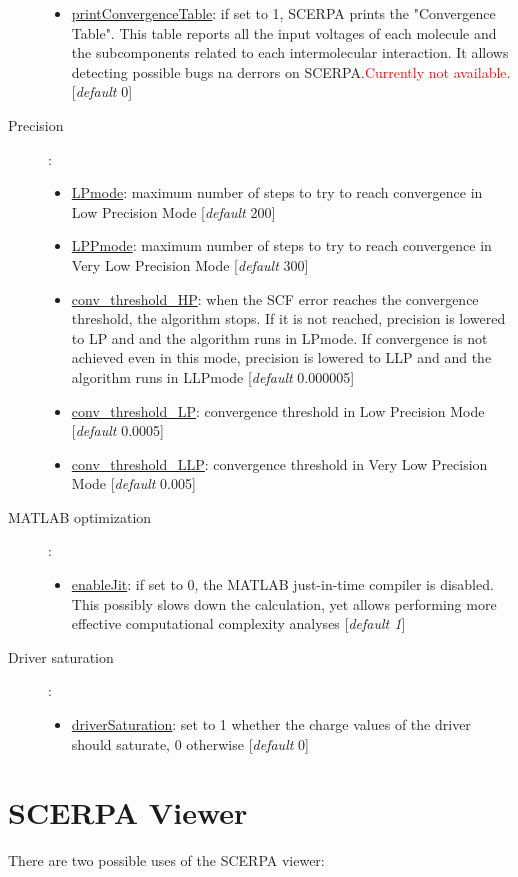 \documentclass[a4paper,10pt]{article}
\begin{document}
\begin{description}
\begin{itemize}
	\item \underline{printConvergenceTable}: if set to 1, SCERPA prints the "Convergence Table". This table reports all the input voltages of each molecule and the subcomponents related to each intermolecular interaction. It allows detecting possible bugs na derrors on SCERPA.\textcolor{red}{Currently not available.} [\textit{default} 0] 
	\end{itemize}
\item[Precision]:
	\begin{itemize}
	\item \underline{LPmode}: maximum number of steps to try to reach convergence in Low Precision Mode [\textit{default} 200] 
	\item \underline{LPPmode}: maximum number of steps to try to reach convergence in Very Low Precision Mode [\textit{default} 300] 
	\item \underline{conv\_threshold\_HP}: when the SCF error reaches the convergence threshold, the algorithm stops. If it is not reached, precision is lowered to LP and and the algorithm runs in LPmode. If convergence is not achieved even in this mode, precision is lowered to LLP and and the algorithm runs in LLPmode [\textit{default} 0.000005] 
	\item \underline{conv\_threshold\_LP}: convergence threshold in Low Precision Mode [\textit{default} 0.0005] 
	\item \underline{conv\_threshold\_LLP}: convergence threshold in Very Low Precision Mode [\textit{default} 0.005] 
	\end{itemize}
\item[MATLAB optimization]:
	\begin{itemize}
	\item \underline{enableJit}: if set to 0, the MATLAB just-in-time compiler is disabled. This possibly slows down the calculation, yet allows performing more effective computational complexity analyses [\textit{default 1}] 
	\end{itemize}
\item[Driver saturation]:
	\begin{itemize}
	\item \underline{driverSaturation}: set to 1 whether the charge values of the driver should saturate, 0 otherwise [\textit{default} 0]
	\end{itemize}
\end{description}

\section{SCERPA Viewer}
There are two possible uses of the SCERPA viewer:
\end{document}

